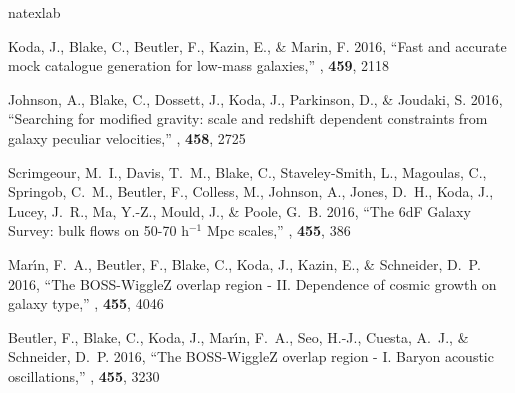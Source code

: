 
\renewcommand{\section}[2]{\vspace{2\baselineskip}\refstepcounter{section}{\bf \textsf{#2}}\vspace{0.25\baselineskip}}
\renewcommand{\refname}{Submitted / Refereed Publications}
\begin{thebibliography}{8}
\expandafter\ifx\csname natexlab\endcsname\relax\def\natexlab#1{#1}\fi

{Koda}, J., {Blake}, C., {Beutler}, F., {Kazin}, E., \& {Marin}, F. 2016,
  ``{Fast and accurate mock catalogue generation for low-mass galaxies},'' {\em
  \mnras\/}, {\bf 459}, 2118

{Johnson}, A., {Blake}, C., {Dossett}, J., {Koda}, J., {Parkinson}, D., \&
  {Joudaki}, S. 2016, ``{Searching for modified gravity: scale and redshift
  dependent constraints from galaxy peculiar velocities},'' {\em \mnras\/},
  {\bf 458}, 2725

{Scrimgeour}, M.~I., {Davis}, T.~M., {Blake}, C., {Staveley-Smith}, L.,
  {Magoulas}, C., {Springob}, C.~M., {Beutler}, F., {Colless}, M., {Johnson},
  A., {Jones}, D.~H., {Koda}, J., {Lucey}, J.~R., {Ma}, Y.-Z., {Mould}, J., \&
  {Poole}, G.~B. 2016, ``{The 6dF Galaxy Survey: bulk flows on 50-70 h$^{-1}$
  Mpc scales},'' {\em \mnras\/}, {\bf 455}, 386

{Mar{\'{\i}}n}, F.~A., {Beutler}, F., {Blake}, C., {Koda}, J., {Kazin}, E., \&
  {Schneider}, D.~P. 2016, ``{The BOSS-WiggleZ overlap region - II. Dependence
  of cosmic growth on galaxy type},'' {\em \mnras\/}, {\bf 455}, 4046

{Beutler}, F., {Blake}, C., {Koda}, J., {Mar{\'{\i}}n}, F.~A., {Seo}, H.-J.,
  {Cuesta}, A.~J., \& {Schneider}, D.~P. 2016, ``{The BOSS-WiggleZ overlap
  region - I. Baryon acoustic oscillations},'' {\em \mnras\/}, {\bf 455}, 3230


\end{thebibliography}
